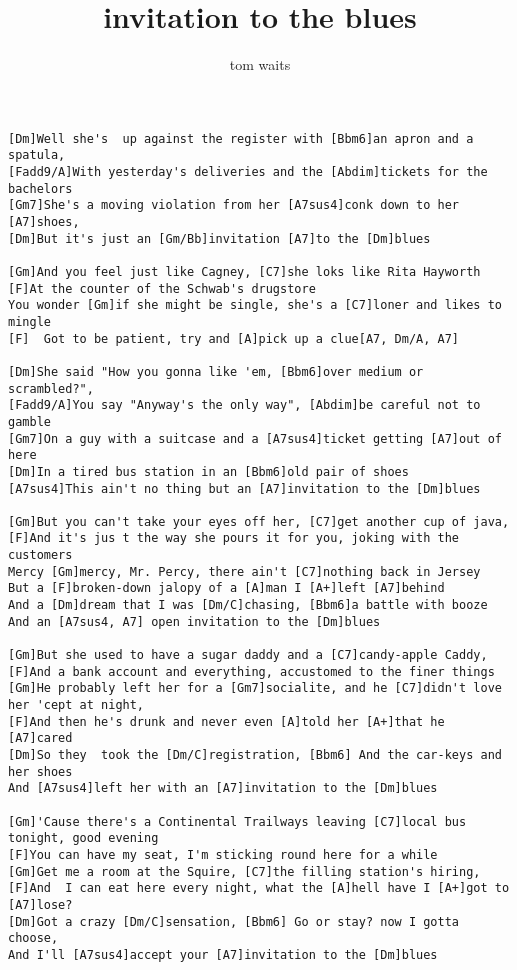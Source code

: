 \author{tom waits}
\title{invitation to the blues}
\maketitle
\begin{verbatim}
[Dm]Well she's  up against the register with [Bbm6]an apron and a spatula,    
[Fadd9/A]With yesterday's deliveries and the [Abdim]tickets for the bachelors    
[Gm7]She's a moving violation from her [A7sus4]conk down to her [A7]shoes,    
[Dm]But it's just an [Gm/Bb]invitation [A7]to the [Dm]blues    

[Gm]And you feel just like Cagney, [C7]she loks like Rita Hayworth    
[F]At the counter of the Schwab's drugstore    
You wonder [Gm]if she might be single, she's a [C7]loner and likes to mingle    
[F]  Got to be patient, try and [A]pick up a clue[A7, Dm/A, A7]

[Dm]She said "How you gonna like 'em, [Bbm6]over medium or scrambled?",    
[Fadd9/A]You say "Anyway's the only way", [Abdim]be careful not to gamble    
[Gm7]On a guy with a suitcase and a [A7sus4]ticket getting [A7]out of here    
[Dm]In a tired bus station in an [Bbm6]old pair of shoes    
[A7sus4]This ain't no thing but an [A7]invitation to the [Dm]blues    

[Gm]But you can't take your eyes off her, [C7]get another cup of java,    
[F]And it's jus t the way she pours it for you, joking with the customers    
Mercy [Gm]mercy, Mr. Percy, there ain't [C7]nothing back in Jersey    
But a [F]broken-down jalopy of a [A]man I [A+]left [A7]behind
And a [Dm]dream that I was [Dm/C]chasing, [Bbm6]a battle with booze    
And an [A7sus4, A7] open invitation to the [Dm]blues   
  
[Gm]But she used to have a sugar daddy and a [C7]candy-apple Caddy,    
[F]And a bank account and everything, accustomed to the finer things    
[Gm]He probably left her for a [Gm7]socialite, and he [C7]didn't love her 'cept at night,    
[F]And then he's drunk and never even [A]told her [A+]that he [A7]cared
[Dm]So they  took the [Dm/C]registration, [Bbm6] And the car-keys and her shoes    
And [A7sus4]left her with an [A7]invitation to the [Dm]blues    

[Gm]'Cause there's a Continental Trailways leaving [C7]local bus tonight, good evening    
[F]You can have my seat, I'm sticking round here for a while    
[Gm]Get me a room at the Squire, [C7]the filling station's hiring,    
[F]And  I can eat here every night, what the [A]hell have I [A+]got to [A7]lose?    
[Dm]Got a crazy [Dm/C]sensation, [Bbm6] Go or stay? now I gotta choose,    
And I'll [A7sus4]accept your [A7]invitation to the [Dm]blues   
\end{verbatim}